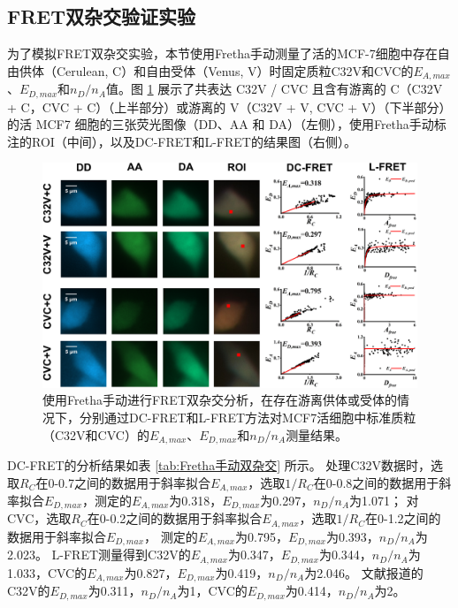 \subsection{FRET双杂交验证实验}
\label{sec:模型质粒FRET双杂交验证实验}

为了模拟FRET双杂交实验，本节使用Fretha手动测量了活的MCF-7细胞中存在自由供体（Cerulean, C）和自由受体（Venus, V）时固定质粒C32V和CVC的$E_{A,max}$、$E_{D,max}$和$n_D/n_A$值。图 \ref{fig:Fretha手动双杂交} 展示了共表达 C32V / CVC 且含有游离的 C（C32V + C，CVC + C）（上半部分）或游离的 V（C32V + V, CVC + V）（下半部分）的活 MCF7 细胞的三张荧光图像（DD、AA 和 DA）（左侧），使用Fretha手动标注的ROI（中间），以及DC-FRET和L-FRET的结果图（右侧）。
\begin{figure}
  \centering
  \includegraphics[width=1\linewidth]{../figures/3/验证-手动双杂交结果.drawio.png}
  \caption[Fretha手动处理的C32V和CVC的FRET双杂交分析结果]{使用Fretha手动进行FRET双杂交分析，在存在游离供体或受体的情况下，分别通过DC-FRET和L-FRET方法对MCF7活细胞中标准质粒（C32V和CVC）的$E_{A, max}$、$E_{D, max}$和$n_D/n_A$测量结果。}
  \label{fig:Fretha手动双杂交}
\end{figure}

DC-FRET的分析结果如表 \ref{tab:Fretha手动双杂交} 所示。
处理C32V数据时，选取$R_C$在0-0.7之间的数据用于斜率拟合$E_{A,max}$，选取$1/R_C$在0-0.8之间的数据用于斜率拟合$E_{D,max}$，测定的$E_{A,max}$为0.318，$E_{D,max}$为0.297，$n_D/n_A$为1.071；
对CVC，选取$R_C$在0-0.2之间的数据用于斜率拟合$E_{A,max}$，选取$1/R_C$在0-1.2之间的数据用于斜率拟合$E_{D,max}$，
测定的$E_{A,max}$为0.795，$E_{D,max}$为0.393，$n_D/n_A$为2.023。
L-FRET测量得到C32V的$E_{A,max}$为0.347，$E_{D,max}$为0.344，$n_D/n_A$为1.033，CVC的$E_{A,max}$为0.827，$E_{D,max}$为0.419，$n_D/n_A$为2.046。
文献报道的C32V的$E_{D,max}$为0.311，$n_D/n_A$为1，CVC的$E_{D,max}$为0.414，$n_D/n_A$为2。

